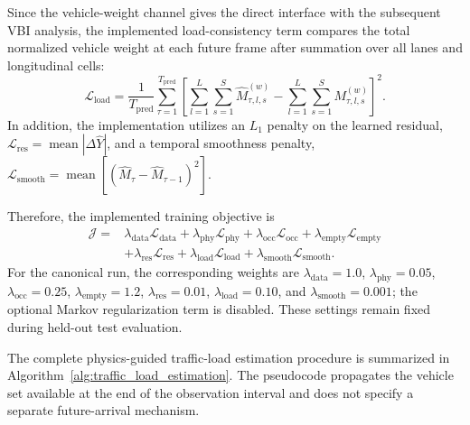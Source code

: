 \documentclass[journal]{IEEEtran}
\begin{document}
Since the vehicle-weight channel gives the direct interface with the subsequent VBI analysis, the implemented load-consistency term compares the total normalized vehicle weight at each future frame after summation over all lanes and longitudinal cells:
\begin{equation}
\mathcal{L}_{\mathrm{load}}
=
\frac{1}{T_{\mathrm{pred}}}
\sum_{\tau=1}^{T_{\mathrm{pred}}}
\left[
\sum_{l=1}^{L}\sum_{s=1}^{S}
\widehat{M}_{\tau,l,s}^{(w)}
-
\sum_{l=1}^{L}\sum_{s=1}^{S}
M_{\tau,l,s}^{(w)}
\right]^2.
\end{equation}
In addition, the implementation utilizes an $L_1$ penalty on the learned residual, $\mathcal{L}_{\mathrm{res}}=\operatorname{mean}|\Delta\widehat{Y}|$, and a temporal smoothness penalty, $\mathcal{L}_{\mathrm{smooth}}=\operatorname{mean}[(\widehat{M}_{\tau}-\widehat{M}_{\tau-1})^2]$.


Therefore, the implemented training objective is
\begin{equation}
\begin{aligned}
\mathcal{J}
={}&
\lambda_{\mathrm{data}}\mathcal{L}_{\mathrm{data}}
+
\lambda_{\mathrm{phy}}\mathcal{L}_{\mathrm{phy}}
+
\lambda_{\mathrm{occ}}\mathcal{L}_{\mathrm{occ}}
+
\lambda_{\mathrm{empty}}\mathcal{L}_{\mathrm{empty}}
\\
&+
\lambda_{\mathrm{res}}\mathcal{L}_{\mathrm{res}}
+
\lambda_{\mathrm{load}}\mathcal{L}_{\mathrm{load}}
+
\lambda_{\mathrm{smooth}}\mathcal{L}_{\mathrm{smooth}}.
\end{aligned}
\end{equation}
For the canonical run, the corresponding weights are $\lambda_{\mathrm{data}}=1.0$, $\lambda_{\mathrm{phy}}=0.05$, $\lambda_{\mathrm{occ}}=0.25$, $\lambda_{\mathrm{empty}}=1.2$, $\lambda_{\mathrm{res}}=0.01$, $\lambda_{\mathrm{load}}=0.10$, and $\lambda_{\mathrm{smooth}}=0.001$; the optional Markov regularization term is disabled. These settings remain fixed during held-out test evaluation.


The complete physics-guided traffic-load estimation procedure is summarized in Algorithm~\ref{alg:traffic_load_estimation}. The pseudocode propagates the vehicle set available at the end of the observation interval and does not specify a separate future-arrival mechanism.
\end{document}
